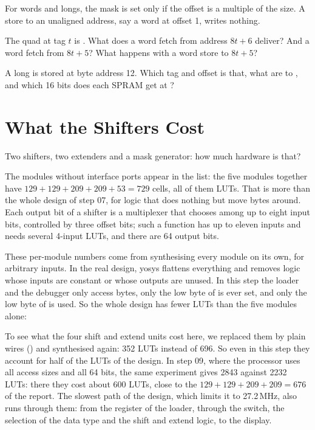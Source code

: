 For words and longs, the mask is set only if the offset is a multiple of the
size. A store to an unaligned address, say a word at offset 1, writes
nothing.

\begin{exercise}
\label{ex:step08-fetch}
The quad at tag $t$ is . What does a word fetch from
address $8t + 6$ deliver? And a word fetch from $8t + 5$? What happens with a
word store to $8t + 5$?
\end{exercise}

\begin{exercise}
\label{ex:step08-store}
A long  is stored at byte address 12. Which tag and offset is
that, what are  to , and which 16 bits does each SPRAM get at
?
\end{exercise}

\section{What the Shifters Cost}
\label{sec:step08-cost}

Two shifters, two extenders and a mask generator: how much hardware is that?


The modules without interface ports appear in the list: the five 
modules together have $129 + 129 + 209 + 209 + 53 = 729$ cells, all of them
LUTs. That is more than the whole design of step 07, for logic that does
nothing but move bytes around. Each output bit of a shifter is a multiplexer
that chooses among up to eight input bits, controlled by three offset bits;
such a function has up to eleven inputs and needs several 4-input LUTs, and
there are 64 output bits.

These per-module numbers come from synthesising every module on its own, for
arbitrary inputs. In the real design, yosys flattens everything and removes
logic whose inputs are constant or whose outputs are unused. In this step the
loader and the debugger only access bytes, only the low byte of
 is ever set, and only the low byte of  is used. So the whole design has fewer LUTs than the five modules
alone:


To see what the four shift and extend units cost here, we replaced them by
plain wires () and synthesised again: 352 LUTs
instead of 696. So even in this step they account for half of the LUTs of the
design. In step 09, where the processor uses all access sizes and all 64 bits,
the same experiment gives 2843 against 2232 LUTs: there they cost about 600
LUTs, close to the $129 + 129 + 209 + 209 = 676$ of the report. The slowest path of the design, which limits it to 27.2\,MHz,
also runs through them: from the register  of the loader, through the
switch, the selection of the data type and the shift and extend logic, to the
display.

